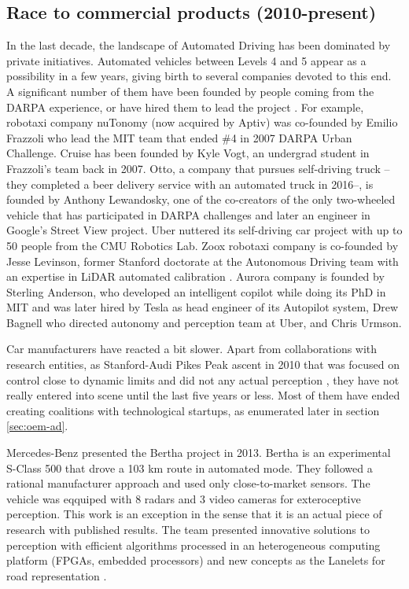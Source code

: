 \subsection{Race to commercial products (2010-present)}
 
In the last decade, the landscape of Automated Driving has been dominated
by private initiatives. Automated vehicles between Levels 4 and 5 appear
as a possibility in a few years, giving birth to several companies devoted to 
this end. 
A significant number of them have been founded by people coming from the 
DARPA experience, or have hired them to lead the project 
\cite{Chapell2016}.
 For
example, robotaxi company nuTonomy (now acquired by Aptiv) was co-founded
by Emilio Frazzoli who lead the MIT team that ended \#4 in 2007 DARPA 
Urban Challenge.
Cruise has been founded by Kyle Vogt, an undergrad student in
Frazzoli's team back in 2007. Otto, a company that pursues self-driving 
truck --they completed a beer delivery service with an automated truck 
in 2016--, is founded by Anthony Lewandosky, one of the co-creators of
the only two-wheeled vehicle that has participated in DARPA challenges
and later an engineer in Google's Street View project.
Uber nuttered its self-driving car project with up to 50 people from the CMU
Robotics Lab.
Zoox robotaxi company is co-founded by Jesse Levinson, former Stanford doctorate
at the Autonomous Driving team with an expertise in LiDAR automated calibration
\cite{Levinson2011a}.
Aurora company is founded by Sterling Anderson, who developed an intelligent 
copilot \cite{Anderson2013} while doing its PhD in MIT and was later hired by
Tesla as head engineer of its Autopilot system, Drew Bagnell who directed 
autonomy and perception team at Uber, and Chris Urmson.

Car manufacturers have reacted a bit slower. Apart from collaborations with
research entities, as Stanford-Audi Pikes Peak ascent in 2010 that was
focused on control close to dynamic limits and did not any actual perception
\cite{Funke2012}, 
they have not really entered into scene until the last five years or less. 
Most of them have ended creating coalitions with technological startups, as 
enumerated later in section \ref{sec:oem-ad}.

Mercedes-Benz presented the Bertha project in 2013. Bertha is an experimental
S-Class 500 that drove a 103 km route in automated mode. They followed a
rational manufacturer approach and used only close-to-market sensors.
The vehicle was eqquiped with 8 radars and 3 video cameras for exteroceptive 
perception.
This work is an exception in the sense that it is an actual piece of research
with published results. The team presented innovative solutions to perception 
\cite{Bender2014} with efficient algorithms processed in an heterogeneous 
computing platform (FPGAs, embedded processors) and new concepts as the 
Lanelets for road representation \cite{Ziegler2014}.

